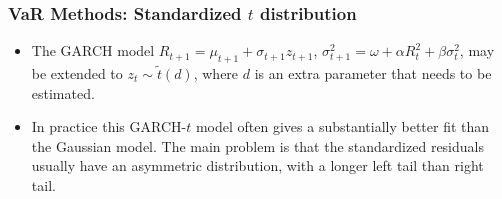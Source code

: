 \begin{frame}%

\frametitle{VaR Methods: Standardized $t$ distribution}

\begin{itemize}
\item The GARCH model $R_{t+1}=\mu_{t+1}+\sigma _{t+1}z_{t+1}$, $\sigma
_{t+1}^{2}=\omega +\alpha R_{t}^{2}+\beta \sigma _{t}^{2}$, may be extended
to $z_{t}\sim \tilde{t}(d)$, where $d$ is an extra parameter that needs to be estimated.


\item In practice this GARCH-$t$ model often gives a substantially better
fit than the Gaussian model. The main problem is that the standardized
residuals usually have an asymmetric distribution, with a longer left tail
than right tail.
\end{itemize}

\end{frame}%


